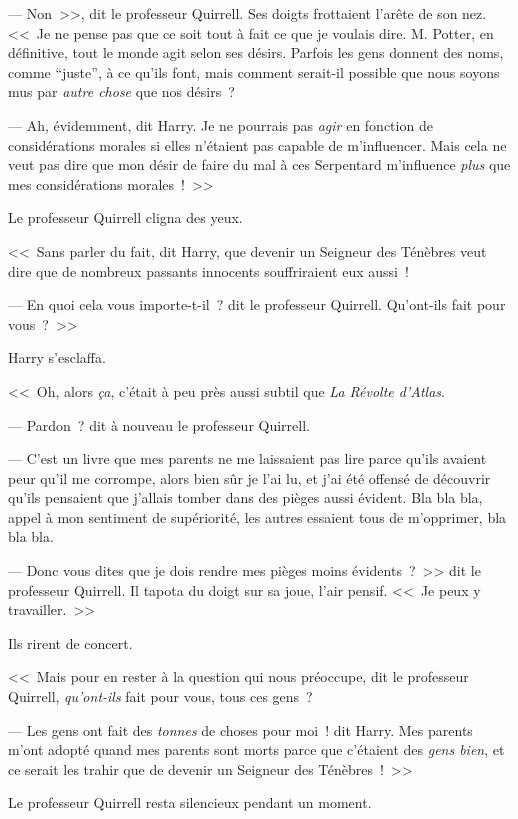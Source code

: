--- Non~>>, dit le professeur Quirrell. Ses doigts frottaient l'arête de son nez. <<~Je ne pense pas que ce soit tout à fait ce que je voulais dire. M. Potter, en définitive, tout le monde agit selon ses désirs. Parfois les gens donnent des noms, comme “juste”, à ce qu'ils font, mais comment serait-il possible que nous soyons mus par \emph{autre chose} que nos désirs~?

--- Ah, évidemment, dit Harry. Je ne pourrais pas \emph{agir} en fonction de considérations morales si elles n'étaient pas capable de m'influencer. Mais cela ne veut pas dire que mon désir de faire du mal à ces Serpentard m'influence \emph{plus} que mes considérations morales~!~>>

Le professeur Quirrell cligna des yeux.

<<~Sans parler du fait, dit Harry, que devenir un Seigneur des Ténèbres veut dire que de nombreux passants innocents souffriraient eux aussi~!

--- En quoi cela vous importe-t-il~? dit le professeur Quirrell. Qu'ont-ils fait pour vous~?~>>

Harry s'esclaffa.

<<~Oh, alors \emph{ça}, c'était à peu près aussi subtil que \emph{La Révolte d'Atlas}.

--- Pardon~? dit à nouveau le professeur Quirrell.

--- C'est un livre que mes parents ne me laissaient pas lire parce qu'ils avaient peur qu'il me corrompe, alors bien sûr je l'ai lu, et j'ai été offensé de découvrir qu'ils pensaient que j'allais tomber dans des pièges aussi évident. Bla bla bla, appel à mon sentiment de supériorité, les autres essaient tous de m'opprimer, bla bla bla.

--- Donc vous dites que je dois rendre mes pièges moins évidents~?~>> dit le professeur Quirrell. Il tapota du doigt sur sa joue, l'air pensif. <<~Je peux y travailler.~>>

Ils rirent de concert.

<<~Mais pour en rester à la question qui nous préoccupe, dit le professeur Quirrell, \emph{qu'ont-ils} fait pour vous, tous ces gens~?

--- Les gens ont fait des \emph{tonnes} de choses pour moi~! dit Harry. Mes parents m'ont adopté quand mes parents sont morts parce que c'étaient des \emph{gens bien}, et ce serait les trahir que de devenir un Seigneur des Ténèbres~!~>>

Le professeur Quirrell resta silencieux pendant un moment.

